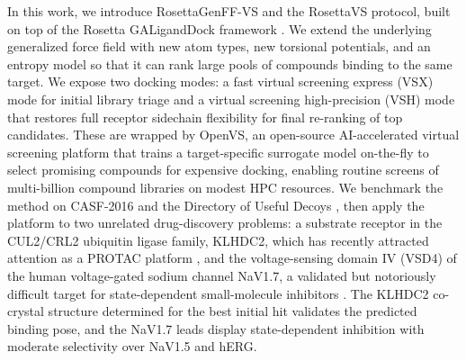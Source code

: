 In this work, we introduce RosettaGenFF-VS and the RosettaVS protocol, built
on top of the Rosetta GALigandDock framework \citep{leman2020rosetta}. We
extend the underlying generalized force field with new atom types, new
torsional potentials, and an entropy model so that it can rank large pools of
compounds binding to the same target. We expose two docking modes: a fast
virtual screening express (VSX) mode for initial library triage and a virtual
screening high-precision (VSH) mode that restores full receptor sidechain
flexibility for final re-ranking of top candidates. These are wrapped by
OpenVS, an open-source AI-accelerated virtual screening platform that trains
a target-specific surrogate model on-the-fly to select promising compounds
for expensive docking, enabling routine screens of multi-billion compound
libraries on modest HPC resources. We benchmark the method on CASF-2016
\citep{su2019casf2016} and the Directory of Useful Decoys
\citep{mysinger2012dude}, then apply the platform to two unrelated
drug-discovery problems: a substrate receptor in the CUL2/CRL2 ubiquitin
ligase family, KLHDC2, which has recently attracted attention as a PROTAC
platform \citep{slusarz2023klhdc3}, and the voltage-sensing domain IV (VSD4)
of the human voltage-gated sodium channel NaV1.7, a validated but notoriously
difficult target for state-dependent small-molecule inhibitors
\citep{wang2015nav17methyl}. The KLHDC2 co-crystal structure determined for
the best initial hit validates the predicted binding pose, and the NaV1.7
leads display state-dependent inhibition with moderate selectivity over
NaV1.5 and hERG.

